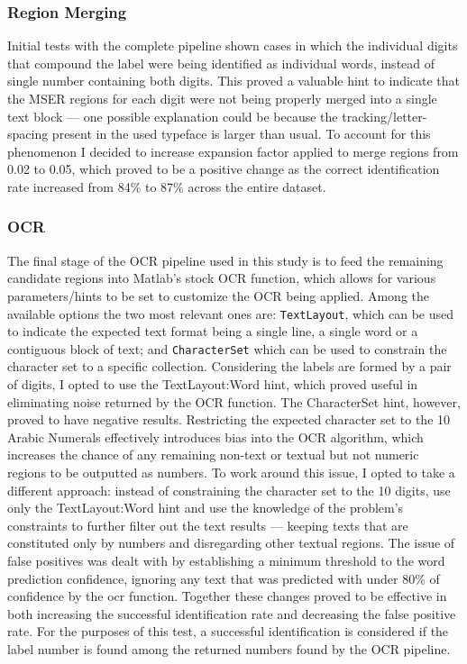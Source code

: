 \documentclass[11pt]{article}
\begin{document}
    \subsubsection{Region Merging}
        Initial tests with the complete pipeline shown cases in which the individual digits that compound the label were being identified as individual words, instead of single number containing both digits. This proved a valuable hint to indicate that the MSER regions for each digit were not being properly merged into a single text block --- one possible explanation could be because the tracking/letter-spacing present in the used typeface is larger than usual. To account for this phenomenon I decided to increase expansion factor applied to merge regions from 0.02 to 0.05, which proved to be a positive change as the correct identification rate increased from 84\% to 87\% across the entire dataset.

    \subsubsection{OCR}
        The final stage of the OCR pipeline used in this study is to feed the remaining candidate regions into Matlab's stock OCR function, which allows for various parameters/hints to be set to customize the OCR being applied. Among the available options the two most relevant ones are: \texttt{TextLayout}, which can be used to indicate the expected text format being a single line, a single word or a contiguous block of text; and \texttt{CharacterSet} which can be used to constrain the character set to a specific collection. Considering the labels are formed by a pair of digits, I opted to use the TextLayout:Word hint, which proved useful in eliminating noise returned by the OCR function. The CharacterSet hint, however, proved to have negative results. Restricting the expected character set to the 10 Arabic Numerals effectively introduces bias into the OCR algorithm, which increases the chance of any remaining non-text or textual but not numeric regions to be outputted as numbers. To work around this issue, I opted to take a different approach: instead of constraining the character set to the 10 digits, use only the TextLayout:Word hint and use the knowledge of the problem's constraints to further filter out the text results --- keeping texts that are constituted only by numbers and disregarding other textual regions. The issue of false positives was dealt with by establishing a minimum threshold to the word prediction confidence, ignoring any text that was predicted with under 80\% of confidence by the ocr function. Together these changes proved to be effective in both increasing the successful identification rate and decreasing the false positive rate. For the purposes of this test, a successful identification is considered if the label number is found among the returned numbers found by the OCR pipeline.
\end{document}
